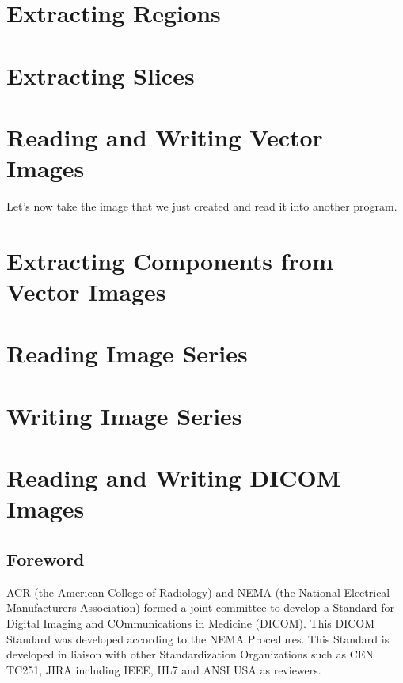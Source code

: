 \section{Extracting Regions}
\label{sec:ImagReadRegionOfInterestWrite}


\section{Extracting Slices}
\label{sec:ImagReadExtractWrite}


\section{Reading and Writing Vector Images}
\label{sec:VectorImagReadWrite}



Let's now take the image that we just created and read it into another program.




\section{Extracting Components from Vector Images}
\label{sec:VectorImageExtractComponent}


\section{Reading Image Series}
\label{sec:ReadingImageSeries}




\section{Writing Image Series}
\label{sec:WritingImageSeries}


\section{Reading and Writing DICOM Images}
\label{sec:ReadingDicomImageSeries2}


\subsection{Foreword}
ACR (the American College of Radiology) and NEMA (the National Electrical Manufacturers Association)
formed a joint committee to develop a Standard for Digital Imaging and COmmunications in Medicine (DICOM).
This DICOM Standard was developed according to the NEMA Procedures. This Standard is developed in liaison with other Standardization Organizations such as CEN TC251, JIRA including IEEE, HL7 and ANSI USA as reviewers.

